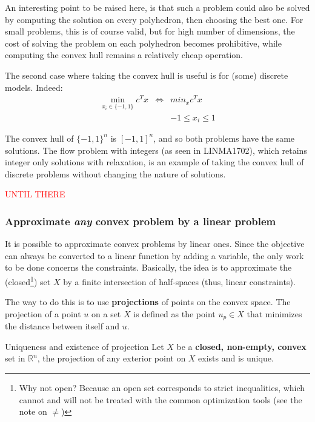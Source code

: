 An interesting point to be raised here, is that such a problem could also be solved by computing the solution on every polyhedron, then choosing the best one. For small problems, this is of course valid, but for high number of dimensions, the cost of solving the problem on each polyhedron becomes prohibitive, while computing the convex hull remains a relatively cheap operation. 

The second case where taking the convex hull is useful is for (some) discrete models. Indeed:
$$\begin{array}{ccl}
\min_{x_i \in \{-1,1\}} c^T x & \Longleftrightarrow & min_{x} c^T x  \\
 & & -1 \leq x_i \leq 1
\end{array}$$

The convex hull of $\{-1,1\}^n$ is $[-1,1]^n$, and so both problems have the same solutions. The flow problem with integers (as seen in LINMA1702), which retains integer only solutions with relaxation, is an example of taking the convex hull of discrete problems without changing the nature of solutions. 

\textcolor{red}{UNTIL THERE}

\subsubsection{Approximate \textit{any} convex problem by a linear problem}

It is possible to approximate convex problems by linear ones. Since the objective can always be converted to a linear function by adding a variable, the only work to be done concerns the constraints. Basically, the idea is to approximate the (closed\footnote{Why not open? Because an open set corresponds to strict inequalities, which cannot and will not be treated with the common optimization tools (see the note on $\neq$)}) set $X$ by a finite intersection of half-spaces (thus, linear constraints).

The way to do this is to use \textbf{projections} of points on the convex space. The projection of a point $u$ on a set $X$ is defined as the point $u_p \in X$ that minimizes the distance between itself and $u$.\\

\begin{theorem}{Uniqueness and existence of projection}
Let $X$ be a \textbf{closed, non-empty, convex} set in $\mathbb{R}^n$, the projection of any exterior point on $X$ exists and is unique.
\end{theorem}

